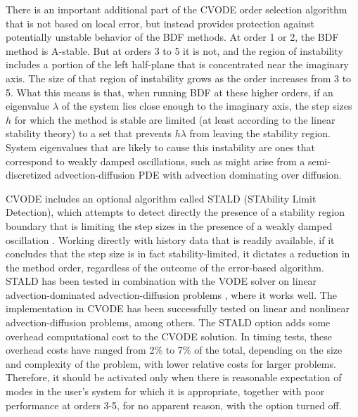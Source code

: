 There is an important additional part of the CVODE order selection
algorithm that is not based on local error, but instead provides
protection against potentially unstable behavior of the BDF methods.
At order 1 or 2, the BDF method is A-stable.  But at orders 3 to 5 it
is not, and the region of instability includes a portion of the left
half-plane that is concentrated near the imaginary axis.  The size of
that region of instability grows as the order increases from 3 to 5.
What this means is that, when running BDF at these higher orders, if
an eigenvalue $\lambda$ of the system lies close enough to the
imaginary axis, the step sizes $h$ for which the method is stable are
limited (at least according to the linear stability theory) to a set
that prevents $h\lambda$ from leaving the stability region.  System
eigenvalues that are likely to cause this instability are ones that
correspond to weakly damped oscillations, such as might arise from a
semi-discretized advection-diffusion PDE with advection dominating
over diffusion.

CVODE includes an optional algorithm called STALD (STAbility Limit
Detection), which attempts to detect directly the presence of a
stability region boundary that is limiting the step sizes in the
presence of a weakly damped oscillation \cite{Hin:92}.  Working
directly with history data that is readily available, if it concludes
that the step size is in fact stability-limited, it dictates a
reduction in the method order, regardless of the outcome of the
error-based algorithm.  STALD has been tested in combination with the
VODE solver on linear advection-dominated advection-diffusion problems
\cite{Hin:95}, where it works well.  The implementation in CVODE has
been successfully tested on linear and nonlinear advection-diffusion
problems, among others.
The STALD option adds some overhead computational cost to the CVODE
solution.  In timing tests, these overhead costs have ranged from 2\%
to 7\% of the total, depending on the size and complexity of the
problem, with lower relative costs for larger problems.  Therefore, it
should be activated only when there is reasonable expectation of modes
in the user's system for which it is appropriate, together with poor
performance at orders 3-5, for no apparent reason, with the option
turned off.
